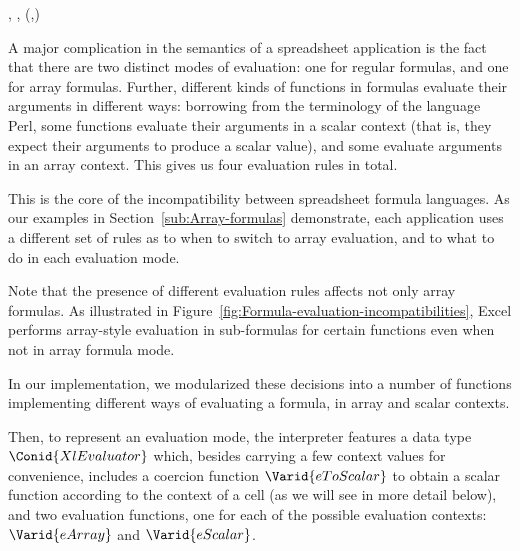 \begin{hscode}\SaveRestoreHook
{}%
%
\>[B]{}\mathbin{::}\;\llparenthesis \cdot , \cdot \rrparenthesis \to {}\to {}\to \llparenthesis \cdot , \cdot \rrparenthesis \to {}\to (,){}\<[E]%
\ColumnHook
\end{hscode}\resethooks

A major complication in the semantics of a spreadsheet application is the
fact that there are two distinct modes of evaluation: one for regular formulas,
and one for array formulas. Further, different kinds of functions in formulas
evaluate their arguments in different ways: borrowing from the terminology
of the language Perl, some functions evaluate their arguments in a scalar
context (that is, they expect their arguments to produce a scalar value),
and some evaluate arguments in an array context. This gives us four evaluation
rules in total.

This is the core of the incompatibility between spreadsheet formula languages.
As our examples in Section~\ref{sub:Array-formulas} demonstrate, each
application uses a different set of rules as to when to switch to array
evaluation, and to what to do in each evaluation mode.

Note that the presence of different evaluation rules affects not only array
formulas. As illustrated in Figure~\ref{fig:Formula-evaluation-incompatibilities},
Excel performs array-style evaluation in sub-formulas for certain functions
even when not in array formula mode.

In our implementation, we modularized these decisions into a number of
functions implementing different ways of evaluating a formula, in array and
scalar contexts.

Then, to represent an evaluation mode, the interpreter features a data type
\ensuremath{\Conid{XlEvaluator}} which, besides carrying a few context values for convenience,
includes a coercion function \ensuremath{\Varid{eToScalar}} to obtain a scalar function according
to the context of a cell (as we will see in more detail below), and two
evaluation functions, one for each of the possible evaluation contexts:
\ensuremath{\Varid{eArray}} and \ensuremath{\Varid{eScalar}}.

